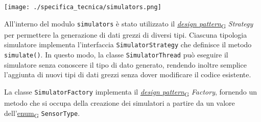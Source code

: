 \begin{center}
	\texttt{[image: ./specifica\_tecnica/simulators.png]}
\end{center}

All'interno del modulo \texttt{simulators} è stato utilizzato il \href{https://7last.github.io/docs/pb/documentazione-interna/glossario\#design-pattern}{\textit{design pattern}\textsubscript{G}} \textit{Strategy} per permettere la generazione di dati grezzi di diversi tipi.
Ciascuna tipologia simulatore implementa l'interfaccia \texttt{SimulatorStrategy} che definisce il metodo \texttt{simulate()}. In questo modo, la classe \texttt{SimulatorThread}
può eseguire il simulatore senza conoscere il tipo di dato generato, rendendo inoltre semplice l'aggiunta di nuovi tipi di dati grezzi senza dover modificare il codice esistente.

La classe \texttt{SimulatorFactory} implementa il \href{https://7last.github.io/docs/pb/documentazione-interna/glossario\#design-pattern}{\textit{design pattern}\textsubscript{G}} \textit{Factory}, fornendo un metodo che si occupa della creazione dei simulatori
a partire da un valore dell'\href{https://7last.github.io/docs/pb/documentazione-interna/glossario\#enumerazione}{enum\textsubscript{G}} \texttt{SensorType}.


